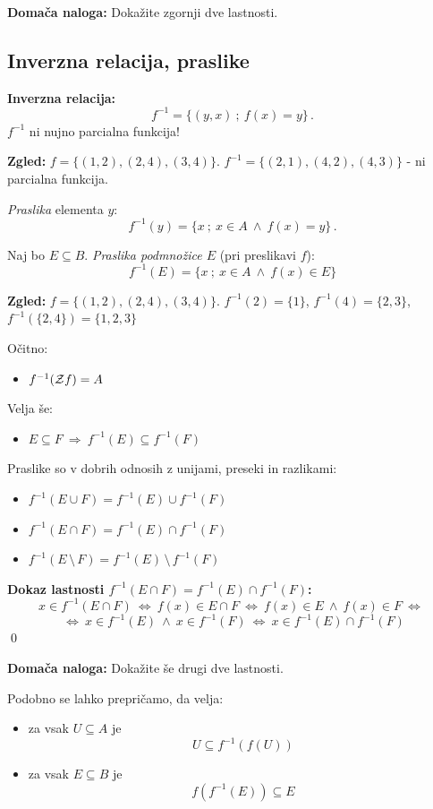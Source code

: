 \documentclass[11pt,paper=b5,footinclude,headinclude]{scrbook} %
\def\inn {{~\wedge~}}
\def\sledi {{~\Rightarrow~}}
\def\brez {{\,\setminus\,}}
\def\cee {{~\Leftrightarrow~}}
\begin{document}
\textbf{ Domača naloga:} Dokažite zgornji dve lastnosti.


\subsection{Inverzna relacija, praslike}

\bigskip
\textbf{ Inverzna relacija:}
$$f^{-1} = \{(y,x)~;~f(x) = y\}\,.$$
$f^{-1}$ ni nujno parcialna funkcija!

\medskip
\textbf{ Zgled:} $f = \{(1,2),(2,4),(3,4)\}$.
$f^{-1} = \{(2,1),(4,2),(4,3)\}$ - ni parcialna funkcija.

\medskip
{\em Praslika} elementa $y$:
$$f^{-1}(y) = \{x~;~x\in A\inn f(x) = y\}\,.$$

Naj bo $E\subseteq B$. {\em Praslika podmnožice $E$} (pri preslikavi $f$):
$$f^{-1}(E) = \{x~;~x\in A\inn f(x) \in E\}$$

\medskip
\textbf{ Zgled:} $f = \{(1,2),(2,4),(3,4)\}$.
$f^{-1}(2) = \{1\}$, $f^{-1}(4) = \{2,3\}$, $f^{-1}(\{2,4\}) = \{1,2,3\}$
\medskip

Očitno:
\begin{itemize}
  \item $f^{-1}({\cal Z}f) = A$
\end{itemize}

\bigskip
Velja še:
\begin{itemize}
  \item $E\subseteq F\sledi f^{-1}(E)\subseteq f^{-1}(F)$
\end{itemize}

\bigskip
Praslike so v dobrih odnosih z unijami, preseki in razlikami:
\begin{itemize}
  \item $f^{-1}(E\cup F)= f^{-1}(E)\cup f^{-1}(F)$
  \item $f^{-1}(E\cap F)= f^{-1}(E)\cap f^{-1}(F)$
  \item $f^{-1}(E\brez F)= f^{-1}(E)\brez f^{-1}(F)$
\end{itemize}

\textbf{ Dokaz lastnosti $f^{-1}(E\cap F)= f^{-1}(E)\cap f^{-1}(F)$:}
$$x\in f^{-1}(E\cap F)\cee
f(x)\in E\cap F\cee
f(x)\in E \inn f(x)\in F\cee$$ $$\cee x\in f^{-1}(E) \inn x\in f^{-1}(F)
\cee x\in f^{-1}(E)\cap f^{-1}(F)$$
\qed

\textbf{ Domača naloga:} Dokažite še drugi dve lastnosti.

\bigskip
Podobno se lahko prepričamo, da velja:
\begin{itemize}
  \item za vsak $U\subseteq A$ je $$U\subseteq f^{-1}(f(U))$$
  \item za vsak $E\subseteq B$ je $$f(f^{-1}(E))\subseteq E$$
\end{itemize}
\end{document}
